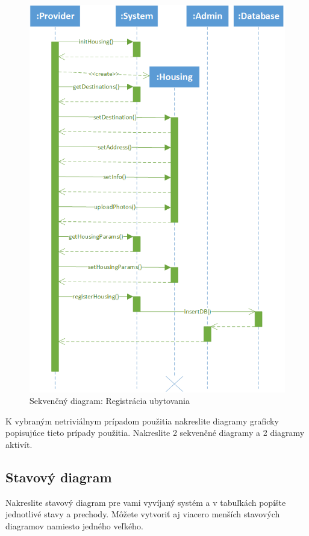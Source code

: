 \begin{figure}[!htbp]
    \centering
    \includegraphics[width=.95\linewidth]{img/seq_registerHousing.png}
    \caption{Sekvenčný diagram: Registrácia ubytovania}
    \label{seq_diagram_registerHou}
\end{figure}

\newpage

K vybraným netriviálnym prípadom použitia nakreslite
diagramy graficky popisujúce tieto prípady použitia. Nakreslite 2 sekvenčné diagramy a 2
diagramy aktivít.

\subsection{Stavový diagram}
Nakreslite stavový diagram pre vami vyvíjaný systém a v tabuľkách popíšte
jednotlivé stavy a prechody. Môžete vytvoriť aj viacero menších stavových diagramov namiesto
jedného veľkého.

